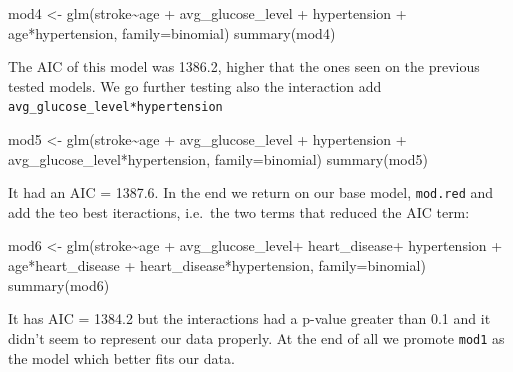 \documentclass[
]{article}
\newenvironment{Shaded}{\begin{snugshade}}{\end{snugshade}}
\newcommand{\AttributeTok}[1]{\textcolor[rgb]{0.77,0.63,0.00}{#1}}
\newcommand{\FunctionTok}[1]{\textcolor[rgb]{0.00,0.00,0.00}{#1}}
\newcommand{\NormalTok}[1]{#1}
\newcommand{\OtherTok}[1]{\textcolor[rgb]{0.56,0.35,0.01}{#1}}
\newcommand{\SpecialCharTok}[1]{\textcolor[rgb]{0.00,0.00,0.00}{#1}}
\begin{document}
\begin{Shaded}
\begin{Highlighting}[]
\NormalTok{mod4 }\OtherTok{\textless{}{-}} \FunctionTok{glm}\NormalTok{(stroke}\SpecialCharTok{\textasciitilde{}}\NormalTok{age }\SpecialCharTok{+}\NormalTok{ avg\_glucose\_level }\SpecialCharTok{+}\NormalTok{ hypertension }\SpecialCharTok{+} 
\NormalTok{              age}\SpecialCharTok{*}\NormalTok{hypertension, }\AttributeTok{family=}\NormalTok{binomial)}
\FunctionTok{summary}\NormalTok{(mod4)}
\end{Highlighting}
\end{Shaded}

The AIC of this model was 1386.2, higher that the ones seen on the
previous tested models. We go further testing also the interaction add
\texttt{avg\_glucose\_level*hypertension}

\begin{Shaded}
\begin{Highlighting}[]
\NormalTok{mod5 }\OtherTok{\textless{}{-}} \FunctionTok{glm}\NormalTok{(stroke}\SpecialCharTok{\textasciitilde{}}\NormalTok{age }\SpecialCharTok{+}\NormalTok{ avg\_glucose\_level }\SpecialCharTok{+}\NormalTok{ hypertension }\SpecialCharTok{+} 
\NormalTok{              avg\_glucose\_level}\SpecialCharTok{*}\NormalTok{hypertension, }\AttributeTok{family=}\NormalTok{binomial)}
\FunctionTok{summary}\NormalTok{(mod5)}
\end{Highlighting}
\end{Shaded}

It had an AIC = 1387.6. In the end we return on our base model,
\texttt{mod.red} and add the teo best iteractions, i.e.~the two terms
that reduced the AIC term:

\begin{Shaded}
\begin{Highlighting}[]
\NormalTok{mod6 }\OtherTok{\textless{}{-}} \FunctionTok{glm}\NormalTok{(stroke}\SpecialCharTok{\textasciitilde{}}\NormalTok{age }\SpecialCharTok{+}\NormalTok{ avg\_glucose\_level}\SpecialCharTok{+}\NormalTok{ heart\_disease}\SpecialCharTok{+}\NormalTok{ hypertension }\SpecialCharTok{+}
\NormalTok{              age}\SpecialCharTok{*}\NormalTok{heart\_disease }\SpecialCharTok{+}\NormalTok{ heart\_disease}\SpecialCharTok{*}\NormalTok{hypertension, }\AttributeTok{family=}\NormalTok{binomial)}
\FunctionTok{summary}\NormalTok{(mod6)}
\end{Highlighting}
\end{Shaded}

It has AIC = 1384.2 but the interactions had a p-value greater than 0.1
and it didn't seem to represent our data properly. At the end of all we
promote \texttt{mod1} as the model which better fits our data.
\end{document}
